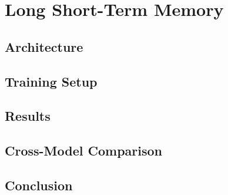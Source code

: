 \section{Long Short-Term Memory}
\label{sec:lstm}


\subsection{Architecture}

%

\subsection{Training Setup}


\subsection{Results}




\subsection{Cross-Model Comparison}

%
%

\subsection{Conclusion}

